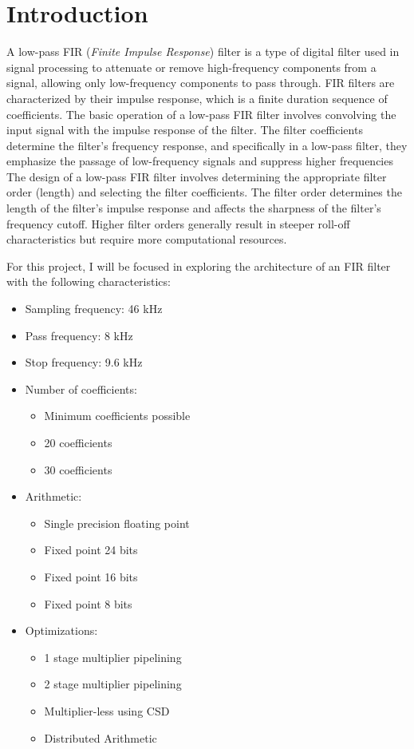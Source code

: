 \section{Introduction}

A low-pass FIR (\textit{Finite Impulse Response}) filter is a type of digital filter used in signal processing to attenuate or remove high-frequency components from a signal, allowing only low-frequency components to pass through. FIR filters are characterized by their impulse response, which is a finite duration sequence of coefficients.
The basic operation of a low-pass FIR filter involves convolving the input signal with the impulse response of the filter. The filter coefficients determine the filter's frequency response, and specifically in a low-pass filter, they emphasize the passage of low-frequency signals and suppress higher frequencies
The design of a low-pass FIR filter involves determining the appropriate filter order (length) and selecting the filter coefficients. The filter order determines the length of the filter's impulse response and affects the sharpness of the filter's frequency cutoff. Higher filter orders generally result in steeper roll-off characteristics but require more computational resources.

For this project, I will be focused in exploring the architecture of an FIR filter with the following characteristics:

\begin{itemize}
    \item Sampling frequency: 46 kHz
    \item Pass frequency: 8 kHz
    \item Stop frequency: 9.6 kHz
    \item Number of coefficients:
    \begin{itemize}
        \item Minimum coefficients possible
        \item 20 coefficients
        \item 30 coefficients
    \end{itemize}
    \item Arithmetic:
    \begin{itemize}
        \item Single precision floating point
        \item Fixed point 24 bits
        \item Fixed point 16 bits
        \item Fixed point 8 bits
    \end{itemize}
    \item Optimizations:
    \begin{itemize}
        \item 1 stage multiplier pipelining
        \item 2 stage multiplier pipelining
        \item Multiplier-less using CSD
        \item Distributed Arithmetic
    \end{itemize}
\end{itemize}

